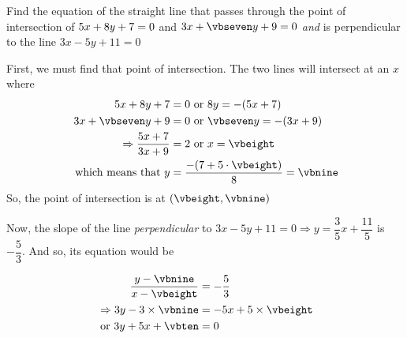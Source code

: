 \gcalcexpr[0]{\vbseven}{\vbtwo / \vbsix} %
\gcalcexpr[2]{\vbeight}{(\vbsix * \vbfive - \vbthree)/(\vbone - \vbsix * \vbfour)} %
\gcalcexpr[2]{\vbnine}{-(\vbthree + \vbone * \vbeight)/\vbtwo}

\question[4] Find the equation of the straight line that passes through the point of intersection of 
$5 x + 8 y + 7 = 0$ and $\vbfour x + \vbseven y + \vbfive = 0$ \textit{and} is 
perpendicular to the line $3x-5y+11 = 0$


\watchout

\ifprintanswers
\fi 

\begin{solution}[\halfpage]
	First, we must find that point of intersection. The two lines will intersect at an $x$ where
	\begin{align}
	    \vbone x + \vbtwo y + \vbthree &= 0 \text{ or } \vbtwo y = -(\vbone x + \vbthree) \\
	    \vbfour x + \vbseven y + \vbfive &= 0 \text { or } \vbseven y = -(\vbfour x + \vbfive) \\
	    \Rightarrow \dfrac{\vbone x + \vbthree}{\vbfour x + \vbfive} &= \vbsix \text{ or } x = \vbeight \\
	    \text{ which means that } y &= \dfrac{-(\vbthree + \vbone\cdot\vbeight)}{\vbtwo} = \vbnine
	\end{align}
	So, the point of intersection is at $(\vbeight, \vbnine)$
	
	Now, the slope of the line \textit{ perpendicular } to 
	$3x - 5y + 11 = 0 \Rightarrow y = \dfrac{3}{5}x + \dfrac{11}{5}$ is $-\dfrac{5}{3}$. And so, its equation
	would be 
	
	
	\begin{align}
		\dfrac{y - \vbnine}{x - \vbeight} &= -\dfrac{5}{3} \\
		\Rightarrow 3y - 3\times\vbnine &= -5x + 5\times\vbeight \\
		\text{ or } 3y + 5x + \vbten &= 0
	\end{align}
	
\end{solution}
